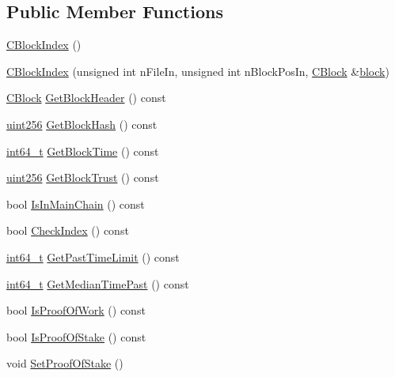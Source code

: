 \subsection*{Public Member Functions}
\begin{DoxyCompactItemize}
\item 
\hyperlink{class_c_block_index_a0eff34cbfb4470885020734581dc1555}{C\+Block\+Index} ()
\item 
\hyperlink{class_c_block_index_a59e8716601432cd20856d45bc2f10633}{C\+Block\+Index} (unsigned int n\+File\+In, unsigned int n\+Block\+Pos\+In, \hyperlink{class_c_block}{C\+Block} \&\hyperlink{core_8h_ace80c27428e237fe24f54ae915a36133}{block})
\item 
\hyperlink{class_c_block}{C\+Block} \hyperlink{class_c_block_index_a34041486523d190d9ede5d83461fdc00}{Get\+Block\+Header} () const 
\item 
\hyperlink{classuint256}{uint256} \hyperlink{class_c_block_index_ab843ef9b8b0a0193ec3a5c24738e484f}{Get\+Block\+Hash} () const 
\item 
\hyperlink{stdint_8h_adec1df1b8b51cb32b77e5b86fff46471}{int64\+\_\+t} \hyperlink{class_c_block_index_ab63b774ae798f5f9e54b400ac8b5ef4b}{Get\+Block\+Time} () const 
\item 
\hyperlink{classuint256}{uint256} \hyperlink{class_c_block_index_ab8cb2abace4e5b6dd405e85f66f17f9a}{Get\+Block\+Trust} () const 
\item 
bool \hyperlink{class_c_block_index_ae75f87263a196d250cc2bf10d70aa510}{Is\+In\+Main\+Chain} () const 
\item 
bool \hyperlink{class_c_block_index_a32c6c256b6e30b4a20dc6faa9cac7ea5}{Check\+Index} () const 
\item 
\hyperlink{stdint_8h_adec1df1b8b51cb32b77e5b86fff46471}{int64\+\_\+t} \hyperlink{class_c_block_index_a52a53d7e151aba62e32ec4ffd165b5a7}{Get\+Past\+Time\+Limit} () const 
\item 
\hyperlink{stdint_8h_adec1df1b8b51cb32b77e5b86fff46471}{int64\+\_\+t} \hyperlink{class_c_block_index_abffb24cc73329a3dce024403ba770b4a}{Get\+Median\+Time\+Past} () const 
\item 
bool \hyperlink{class_c_block_index_ac49e7ad2d6a28e0add2f190cedc95c38}{Is\+Proof\+Of\+Work} () const 
\item 
bool \hyperlink{class_c_block_index_ace1a0acbedc0403489e4d9168876fb23}{Is\+Proof\+Of\+Stake} () const 
\item 
void \hyperlink{class_c_block_index_a4c1eb937c07db986f698909e66754c9e}{Set\+Proof\+Of\+Stake} ()
\item 

\end{DoxyCompactItemize}
